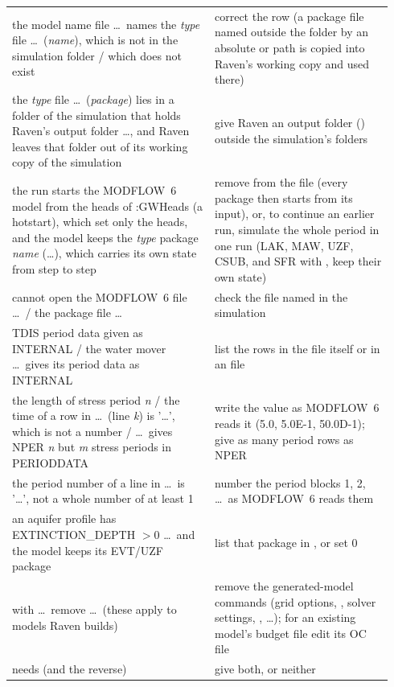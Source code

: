 \begin{longtable}{P{0.5\linewidth}P{0.44\linewidth}}
the model name file \dots\ names the \emph{type} file \dots\ (\emph{name}), which is not in the simulation folder / which does not exist & correct the row (a package file named outside the folder by an absolute or  path is copied into Raven's working copy and used there)\\
the \emph{type} file \dots\ (\emph{package}) lies in a folder of the simulation that holds Raven's output folder \dots, and Raven leaves that folder out of its working copy of the simulation & give Raven an output folder () outside the simulation's folders\\
the run starts the MODFLOW~6 model from the heads of :GWHeads (a hotstart), which set only the heads, and the model keeps the \emph{type} package \emph{name} (\dots), which carries its own state from step to step & remove  from the  file (every package then starts from its input), or, to continue an earlier run, simulate the whole period in one run (LAK, MAW, UZF, CSUB, and SFR with , keep their own state)\\
cannot open the MODFLOW~6 file \dots\ / the package file \dots & check the file named in the simulation\\
TDIS period data given as INTERNAL / the water mover \dots\ gives its period data as INTERNAL & list the rows in the file itself or in an  file\\
the length of stress period \emph{n} / the time of a row in \dots\ (line \emph{k}) is '\dots', which is not a number / \dots\ gives NPER \emph{n} but \emph{m} stress periods in PERIODDATA & write the value as MODFLOW~6 reads it (5.0, 5.0E-1, 50.0D-1); give as many period rows as NPER\\
the period number of a  line in \dots\ is '\dots', not a whole number of at least 1 & number the period blocks 1, 2, \dots\ as MODFLOW~6 reads them\\
an aquifer profile has EXTINCTION\_DEPTH $>0$ \dots\ and the model keeps its EVT/UZF package & list that package in , or set  0\\
with  \dots\ remove \dots\ (these apply to models Raven builds) & remove the generated-model commands (grid options, , solver settings, , \dots); for an existing model's budget file edit its OC file\\
 needs  (and the reverse) & give both, or neither\\

\end{longtable}
